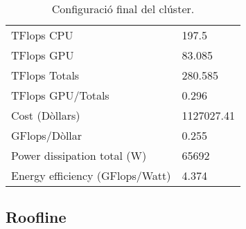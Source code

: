 \begin{table}[H]
\begin{adjustwidth}{-1.0in}{-1.0in}
\begin{center}
\begin{tabular}{l|l}
{\cellcolor[HTML]{EFEFEF}TFlops CPU}                & {\cellcolor[HTML]{EFEFEF}197.5}                    \\
{\color[HTML]{000000}TFlops GPU}                & {\color[HTML]{000000}83.085}                    \\ 
{\cellcolor[HTML]{EFEFEF}TFlops Totals}             & {\cellcolor[HTML]{EFEFEF}280.585}                   \\ 
{\color[HTML]{000000}TFlops GPU/Totals}         & {\color[HTML]{000000} 0.296}                    \\ 
{\cellcolor[HTML]{EFEFEF}Cost (Dòllars)}                 & {\cellcolor[HTML]{EFEFEF}1127027.41}              \\
{\color[HTML]{000000}GFlops/Dòllar}               & {\color[HTML]{000000}0.255}                    \\
    \rowcolor[HTML]{EFEFEF}
Power dissipation total (W) & 65692 \\
    Energy efficiency (GFlops/Watt) & 4.374 \\ \hline
\end{tabular}
\caption{Configuració final del clúster.}
\end{center}
\end{adjustwidth}
\end{table}




\subsection{Roofline}


